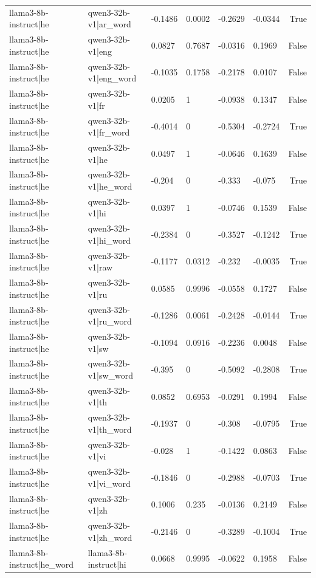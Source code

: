\begin{table}
\begin{tabular}{llllllr}
llama3-8b-instruct|he & qwen3-32b-v1|ar_word & -0.1486 & 0.0002 & -0.2629 & -0.0344 & True \\
llama3-8b-instruct|he & qwen3-32b-v1|eng & 0.0827 & 0.7687 & -0.0316 & 0.1969 & False \\
llama3-8b-instruct|he & qwen3-32b-v1|eng_word & -0.1035 & 0.1758 & -0.2178 & 0.0107 & False \\
llama3-8b-instruct|he & qwen3-32b-v1|fr & 0.0205 & 1 & -0.0938 & 0.1347 & False \\
llama3-8b-instruct|he & qwen3-32b-v1|fr_word & -0.4014 & 0 & -0.5304 & -0.2724 & True \\
llama3-8b-instruct|he & qwen3-32b-v1|he & 0.0497 & 1 & -0.0646 & 0.1639 & False \\
llama3-8b-instruct|he & qwen3-32b-v1|he_word & -0.204 & 0 & -0.333 & -0.075 & True \\
llama3-8b-instruct|he & qwen3-32b-v1|hi & 0.0397 & 1 & -0.0746 & 0.1539 & False \\
llama3-8b-instruct|he & qwen3-32b-v1|hi_word & -0.2384 & 0 & -0.3527 & -0.1242 & True \\
llama3-8b-instruct|he & qwen3-32b-v1|raw & -0.1177 & 0.0312 & -0.232 & -0.0035 & True \\
llama3-8b-instruct|he & qwen3-32b-v1|ru & 0.0585 & 0.9996 & -0.0558 & 0.1727 & False \\
llama3-8b-instruct|he & qwen3-32b-v1|ru_word & -0.1286 & 0.0061 & -0.2428 & -0.0144 & True \\
llama3-8b-instruct|he & qwen3-32b-v1|sw & -0.1094 & 0.0916 & -0.2236 & 0.0048 & False \\
llama3-8b-instruct|he & qwen3-32b-v1|sw_word & -0.395 & 0 & -0.5092 & -0.2808 & True \\
llama3-8b-instruct|he & qwen3-32b-v1|th & 0.0852 & 0.6953 & -0.0291 & 0.1994 & False \\
llama3-8b-instruct|he & qwen3-32b-v1|th_word & -0.1937 & 0 & -0.308 & -0.0795 & True \\
llama3-8b-instruct|he & qwen3-32b-v1|vi & -0.028 & 1 & -0.1422 & 0.0863 & False \\
llama3-8b-instruct|he & qwen3-32b-v1|vi_word & -0.1846 & 0 & -0.2988 & -0.0703 & True \\
llama3-8b-instruct|he & qwen3-32b-v1|zh & 0.1006 & 0.235 & -0.0136 & 0.2149 & False \\
llama3-8b-instruct|he & qwen3-32b-v1|zh_word & -0.2146 & 0 & -0.3289 & -0.1004 & True \\
llama3-8b-instruct|he_word & llama3-8b-instruct|hi & 0.0668 & 0.9995 & -0.0622 & 0.1958 & False \\

\end{tabular}
\end{table}
